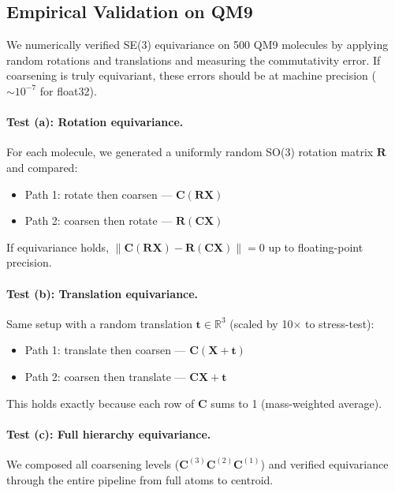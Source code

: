 \documentclass[12pt,a4paper]{article}
\newcommand{\R}{\mathbb{R}}
\begin{document}
\subsection{Empirical Validation on QM9}

We numerically verified SE(3) equivariance on 500 QM9 molecules by applying random rotations and translations and measuring the commutativity error. If coarsening is truly equivariant, these errors should be at machine precision ($\sim10^{-7}$ for float32).

\paragraph{Test (a): Rotation equivariance.}
For each molecule, we generated a uniformly random SO(3) rotation matrix $\bm{R}$ and compared:
\begin{itemize}
  \item Path 1: rotate then coarsen --- $\bm{C}(\bm{R}\bm{X})$
  \item Path 2: coarsen then rotate --- $\bm{R}(\bm{C}\bm{X})$
\end{itemize}
If equivariance holds, $\|\bm{C}(\bm{R}\bm{X}) - \bm{R}(\bm{C}\bm{X})\| = 0$ up to floating-point precision.

\paragraph{Test (b): Translation equivariance.}
Same setup with a random translation $\bm{t} \in \R^3$ (scaled by 10$\times$ to stress-test):
\begin{itemize}
  \item Path 1: translate then coarsen --- $\bm{C}(\bm{X} + \bm{t})$
  \item Path 2: coarsen then translate --- $\bm{C}\bm{X} + \bm{t}$
\end{itemize}
This holds exactly because each row of $\bm{C}$ sums to 1 (mass-weighted average).

\paragraph{Test (c): Full hierarchy equivariance.}
We composed all coarsening levels ($\bm{C}^{(3)} \bm{C}^{(2)} \bm{C}^{(1)}$) and verified equivariance through the entire pipeline from full atoms to centroid.
\end{document}

